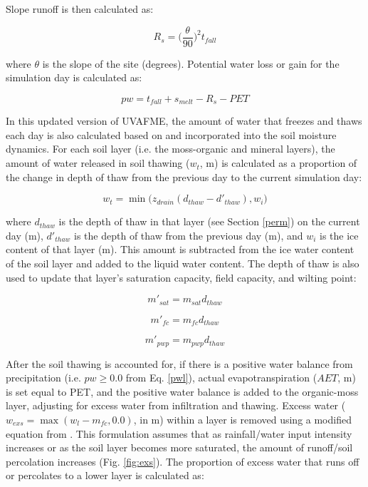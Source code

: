 \documentclass[a4paper, 12pt] {report}
\begin{document}
Slope runoff is then calculated as:

\begin{equation} \label{slr}
R_s = \Big({\frac{\theta}{90}}\Big)^2t_{fall}
\end{equation}

where $\theta$ is the slope of the site (degrees). Potential water loss or gain for the simulation day is calculated as:

\begin{equation} \label{pwl}
pw = t_{fall} + s_{melt} - R_s - PET
\end{equation}

In this updated version of UVAFME, the amount of water that freezes and thaws each day is also calculated based on  and incorporated into the soil moisture dynamics. For each soil layer (i.e. the moss-organic and mineral layers), the amount of water released in soil thawing ($w_t$, m) is calculated as a proportion of the change in depth of thaw from the previous day to the current simulation day:

\begin{equation}
w_t= \min\Big(z_{drain}(d_{thaw} - d'_{thaw}), w_i\Big)
\end{equation}

where $d_{thaw}$ is the depth of thaw in that layer (see Section {\ref{perm}}) on the current day (m), $d'_{thaw}$ is the depth of thaw from the previous day (m), and $w_i$ is the ice content of that layer (m). This amount is subtracted from the ice water content of the soil layer and added to the liquid water content. The depth of thaw is also used to update that layer's saturation capacity, field capacity, and wilting point:

\begin{equation} \label{ms}
m'_{sat} = m_{sat}d_{thaw}
\end{equation}

\begin{equation} \label{mfc}
m'_{fc} = m_{fc}d_{thaw}
\end{equation}

\begin{equation} \label{mpw}
m'_{pwp} = m_{pwp}d_{thaw}
\end{equation}

After the soil thawing is accounted for, if there is a positive water balance from precipitation (i.e. $pw \ge 0.0$ from Eq. \ref{pwl}), actual evapotranspiration ($AET$, m) is set equal to PET, and the positive water balance is added to the organic-moss layer, adjusting for excess water from infiltration and thawing. Excess water ($w_{exs} = \max(w_l - m_{fc}, 0.0)$, in m) within a layer is removed using a modified equation from . This formulation assumes that as rainfall/water input intensity increases or as the soil layer becomes more saturated, the amount of runoff/soil percolation increases (Fig. \ref{fig:exs}). The proportion of excess water that runs off or percolates to a lower layer is calculated as:
\end{document}
